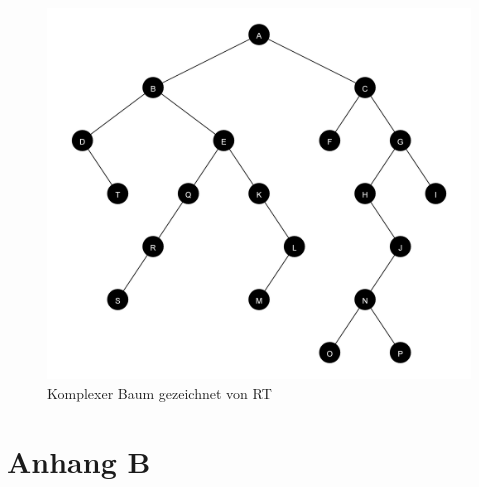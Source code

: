 \begin{figure}[ht]
    \centering
    \includegraphics[scale = 0.12]{abbildungen/komplex_a3}
    \caption{Komplexer Baum gezeichnet von RT}
\end{figure}

\chapter{Anhang B}
\label{chap:anhang_b}















